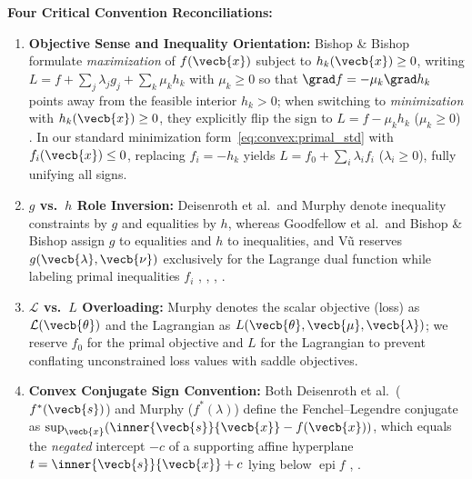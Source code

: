 \documentclass[../../../../master.tex]{subfiles}
\begin{document}
\begin{crossbook}
\textbf{Four Critical Convention Reconciliations:}
\begin{enumerate}[leftmargin=1.4em]
  \item \textbf{Objective Sense and Inequality Orientation:} Bishop \& Bishop formulate \emph{maximization} of $f(\vecb{x})$ subject to $h_k(\vecb{x}) \ge 0$, writing $L = f + \sum_j \lambda_j g_j + \sum_k \mu_k h_k$ with $\mu_k \ge 0$ so that $\grad f = -\mu_k \grad h_k$ points away from the feasible interior $h_k > 0$; when switching to \emph{minimization} with $h_k(\vecb{x}) \ge 0$, they explicitly flip the sign to $L = f - \mu_k h_k$ ($\mu_k \ge 0$) . In our standard minimization form~\eqref{eq:convex:primal_std} with $f_i(\vecb{x}) \le 0$, replacing $f_i = -h_k$ yields $L = f_0 + \sum_i \lambda_i f_i$ ($\lambda_i \ge 0$), fully unifying all signs.
  \item \textbf{$g$ vs.\ $h$ Role Inversion:} Deisenroth et al.\ and Murphy denote inequality constraints by $g$ and equalities by $h$, whereas Goodfellow et al.\ and Bishop \& Bishop assign $g$ to equalities and $h$ to inequalities, and V\~{u} reserves $g(\vecb{\lambda}, \vecb{\nu})$ exclusively for the Lagrange dual function while labeling primal inequalities $f_i$ , , , .
  \item \textbf{$\mathcal{L}$ vs.\ $L$ Overloading:} Murphy denotes the scalar objective (loss) as $\mathcal{L}(\vecb{\theta})$ and the Lagrangian as $L(\vecb{\theta}, \vecb{\mu}, \vecb{\lambda})$; we reserve $f_0$ for the primal objective and $L$ for the Lagrangian to prevent conflating unconstrained loss values with saddle objectives.
  \item \textbf{Convex Conjugate Sign Convention:} Both Deisenroth et al.\ ($f^*(\vecb{s})$) and Murphy ($f^*(\lambda)$) define the Fenchel--Legendre conjugate as $\sup_{\vecb{x}}(\inner{\vecb{s}}{\vecb{x}} - f(\vecb{x}))$, which equals the \emph{negated} intercept $-c$ of a supporting affine hyperplane $t = \inner{\vecb{s}}{\vecb{x}} + c$ lying below $\operatorname{epi} f$ , .
\end{enumerate}
\end{crossbook}
\end{document}
